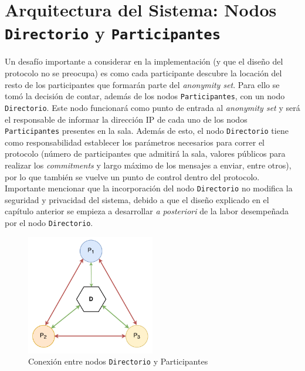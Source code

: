 \section{Arquitectura del Sistema: Nodos \texttt{Directorio} y 
\texttt{Participantes}}

Un desafío importante a considerar en la implementación (y que el diseño del 
protocolo no se preocupa) es como cada participante descubre la locación del 
resto de los participantes que formarán parte del \emph{anonymity set}. Para 
ello se tomó la decisión de contar, además de los nodos 
\texttt{Participantes}, con un nodo \texttt{Directorio}. Este nodo funcionará 
como punto de entrada al \emph{anonymity set} y será el responsable de 
informar la dirección IP de cada uno de los nodos \texttt{Participantes} 
presentes en la sala. Además de esto, el nodo \texttt{Directorio} tiene como 
responsabilidad establecer los parámetros necesarios para correr el protocolo 
(número de participantes que admitirá la sala, valores públicos para realizar 
los \emph{commitments} y largo máximo de los mensajes a enviar, entre otros), 
por lo que también se vuelve un punto de control dentro del protocolo. 
Importante mencionar que la incorporación del nodo \texttt{Directorio} no 
modifica la seguridad y privacidad del sistema, debido a que el diseño 
explicado en el capítulo anterior se empieza a desarrollar \emph{a posteriori} 
de la labor desempeñada por el nodo 
\texttt{Directorio}.

\begin{figure}[H]
  \centering
    \includegraphics[width=0.5\textwidth]{imagenes/architecture.pdf}
  \caption{Conexión entre nodos \texttt{Directorio} y Participantes}
  \label{fig:connections-directory-participants}
\end{figure}

